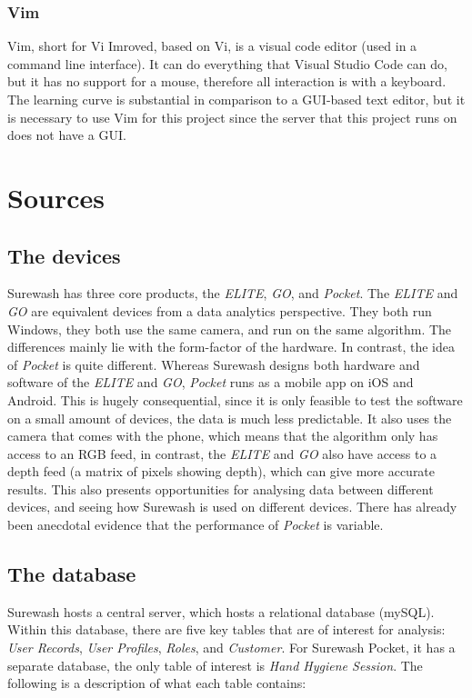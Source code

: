         \subsubsection{Vim}
        Vim, short for Vi Imroved, based on Vi, is a visual code editor (used in a command line interface). It can do everything that Visual Studio Code can do, but it has no support for a mouse, therefore all interaction is with a keyboard. The learning curve is substantial in comparison to a GUI-based text editor, but it is necessary to use Vim for this project since the server that this project runs on does not have a GUI.


\section{Sources}
    \subsection{The devices} Surewash has three core products, the {\slshape ELITE}, {\slshape GO}, and {\slshape Pocket}. The {\slshape ELITE} and {\slshape GO} are equivalent devices from a data analytics perspective. They both run Windows, they both use the same camera, and run on the same algorithm. The differences mainly lie with the form-factor of the hardware. In contrast, the idea of {\slshape Pocket} is quite different. Whereas Surewash designs both hardware and software of the {\slshape ELITE} and {\slshape GO}, {\slshape Pocket} runs as a mobile app on iOS and Android. This is hugely consequential, since it is only feasible to test the software on a small amount of devices, the data is much less predictable. It also uses the camera that comes with the phone, which means that the algorithm only has access to an RGB feed, in contrast, the {\slshape ELITE} and {\slshape GO} also have access to a depth feed (a matrix of pixels showing depth), which can give more accurate results. This also presents opportunities for analysing data between different devices, and seeing how Surewash is used on different devices. There has already been anecdotal evidence that the performance of {\slshape Pocket} is variable.
    \subsection{The database}
    Surewash hosts a central server, which hosts a relational database (mySQL). Within this database, there are five key tables that are of interest for analysis: {\slshape User Records}, {\slshape User Profiles}, {\slshape Roles}, and {\slshape Customer}. For Surewash Pocket, it has a separate database, the only table of interest is {\slshape Hand Hygiene Session}. The following is a description of what each table contains:
